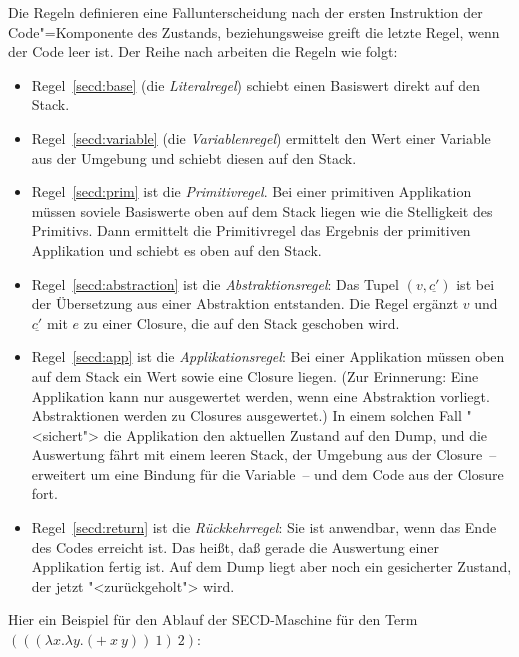 %
Die Regeln definieren eine Fallunterscheidung nach der ersten
Instruktion der Code"=Komponente des Zustands, beziehungsweise greift die letzte
Regel, wenn der Code leer ist.  Der Reihe nach arbeiten die Regeln wie
folgt:
%
\begin{itemize}
\item Regel~\ref{secd:base} (die
  \textit{Literalregel}) schiebt einen Basiswert
  direkt auf den Stack.
\item Regel~\ref{secd:variable} (die
  \textit{Variablenregel}) ermittelt den Wert
  einer Variable aus der Umgebung und schiebt diesen auf den Stack.
\item Regel~\ref{secd:prim} ist die
  \textit{Primitivregel}.  Bei einer primitiven
  Applikation müssen soviele Basiswerte oben auf dem Stack liegen wie
  die Stelligkeit des Primitivs.  Dann ermittelt die Primitivregel das Ergebnis der
  primitiven Applikation und schiebt es oben auf den Stack.
\item Regel~\ref{secd:abstraction} ist die
  \textit{Abstraktionsregel}: Das Tupel
  $(v,\underline{c'})$ ist bei der Übersetzung aus einer Abstraktion
  entstanden.  Die Regel ergänzt $v$ und $\underline{c'}$ mit
  $e$ zu einer Closure, die auf den Stack geschoben wird.
\item Regel~\ref{secd:app} ist die
  \textit{Applikationsregel}: Bei einer
  Applikation müssen oben auf dem Stack ein Wert sowie eine Closure
  liegen.  (Zur Erinnerung: Eine Applikation kann nur ausgewertet
  werden, wenn eine Abstraktion vorliegt.  Abstraktionen werden zu
  Closures ausgewertet.)  In einem solchen Fall "<sichert"> die
  Applikation den aktuellen Zustand auf den Dump, und die Auswertung fährt mit
  einem leeren Stack, der Umgebung aus der Closure~-- erweitert um
  eine Bindung für die Variable~-- und dem Code aus der Closure fort.
\item Regel~\ref{secd:return} ist die
  \textit{Rückkehrregel}: Sie ist anwendbar,
  wenn das Ende des Codes erreicht ist.  Das heißt, daß gerade
  die Auswertung einer Applikation fertig ist.  Auf dem Dump liegt
  aber noch ein gesicherter Zustand, der jetzt "<zurückgeholt"> wird.
\end{itemize}
%
Hier ein Beispiel für den Ablauf der SECD-Maschine für den Term
$(((\lambda x.\lambda y.(+~x~y))~1)~2)$:
%

